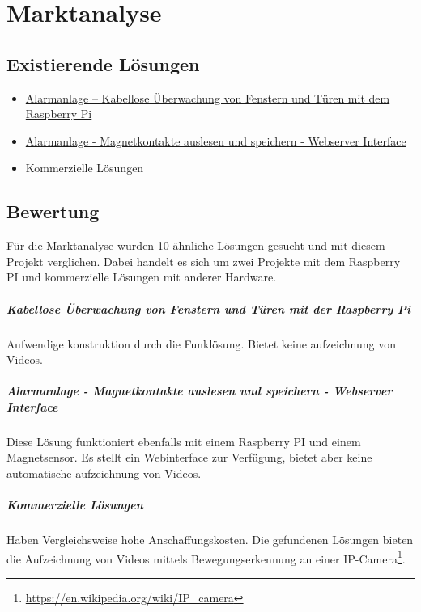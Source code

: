 \chapter{Marktanalyse}
\section{Existierende L\"osungen}

\begin{description}
   \begin{itemize}
    \item \href{http://www.forum-raspberrypi.de/Thread-funk-magnetkontakt-reed-switch-zur-fenster-tuer-ueberwachung-tinytx3}{Alarmanlage – Kabellose Überwachung von Fenstern und Türen mit dem Raspberry Pi}
    \item \href{http://www.forum-raspberrypi.de/Thread-tutorial-alarmanlage-magnetkontakte-auslesen-und-speichern-webserver-interface}{Alarmanlage - Magnetkontakte auslesen und speichern - Webserver Interface}
    \item Kommerzielle Lösungen
   \end{itemize}
\end{description}

\section{Bewertung}

Für die Marktanalyse wurden 10 ähnliche Lösungen gesucht und mit diesem Projekt verglichen.
Dabei handelt es sich um zwei Projekte mit dem Raspberry PI und kommerzielle Lösungen mit anderer Hardware.

\paragraph {Kabellose Überwachung von Fenstern und Türen mit der Raspberry Pi} 

Aufwendige konstruktion durch die Funklösung. Bietet keine aufzeichnung von Videos.

\paragraph {Alarmanlage - Magnetkontakte auslesen und speichern - Webserver Interface} 

Diese Lösung funktioniert ebenfalls mit einem Raspberry PI und einem Magnetsensor. Es stellt ein Webinterface zur Verfügung, bietet aber keine automatische aufzeichnung von Videos.

\paragraph {Kommerzielle Lösungen}

Haben Vergleichsweise hohe Anschaffungskosten. Die gefundenen Lösungen bieten die Aufzeichnung von Videos mittels Bewegungserkennung an einer IP-Camera\footnote{\href{https://en.wikipedia.org/wiki/IP_camera}{https://en.wikipedia.org/wiki/IP_camera}}.